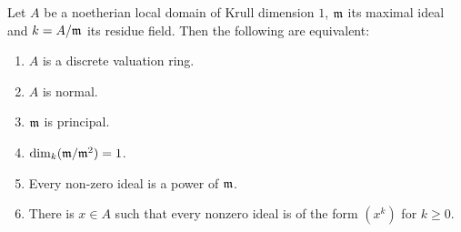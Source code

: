 \begin{theorem}
    Let $A$ be a noetherian local domain of Krull dimension $1$, $\mathfrak m$ its maximal ideal and $k = A/\mathfrak m$ its residue field. Then the following are equivalent: 
    \begin{enumerate}[label=(\alph*)]
        \item $A$ is a discrete valuation ring.
        \item $A$ is normal.
        \item $\mathfrak m$ is principal. 
        \item $\dim_k(\mathfrak m/\mathfrak m^2) = 1$.
        \item Every non-zero ideal is a power of $\mathfrak m$. 
        \item There is $x\in A$ such that every nonzero ideal is of the form $(x^k)$ for $k\ge 0$. 
    \end{enumerate}
\end{theorem}
